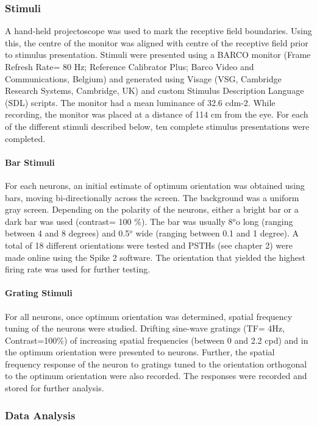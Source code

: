 \subsubsection{Stimuli}
A hand-held projectoscope was used to mark the receptive field boundaries. Using this, the centre of the monitor was aligned with centre of the receptive field prior to stimulus presentation. Stimuli were presented using a BARCO monitor (Frame Refresh Rate= 80 Hz; Reference Calibrator Plus; Barco Video and Communications, Belgium) and generated using Visage (VSG, Cambridge Research Systems, Cambridge, UK) and custom Stimulus Description Language (SDL) scripts. The monitor had a mean luminance of 32.6 cdm-2. While recording, the monitor was placed at a distance of 114 cm from the eye. For each of the different stimuli described below, ten complete stimulus presentations were completed.
\paragraph{Bar Stimuli}
For each neurons, an initial estimate of optimum orientation was obtained using bars, moving bi-directionally across the screen. The background was a uniform gray screen. Depending on the polarity of the neurons, either a bright bar or a dark bar was used (contrast= 100 \%). The bar was usually 8$^o$o long (ranging between 4 and 8 degrees) and 0.5$^o$ wide (ranging between 0.1 and 1 degree). A total of 18 different orientations were tested and PSTHs (see chapter 2) were made online using the Spike 2 software. The orientation that yielded the highest firing rate was used for further testing.

\paragraph{Grating Stimuli}
For all neurons, once optimum orientation was determined, spatial frequency tuning of the neurons were studied. Drifting sine-wave gratings (TF= 4Hz, Contrast=100\%) of increasing spatial frequencies (between 0 and 2.2 cpd) and in the optimum orientation were presented to neurons. Further, the spatial frequency response of the neuron to gratings tuned to the orientation orthogonal to the optimum orientation were also recorded. The responses were recorded and stored for further analysis.

\subsubsection{Data Analysis}

